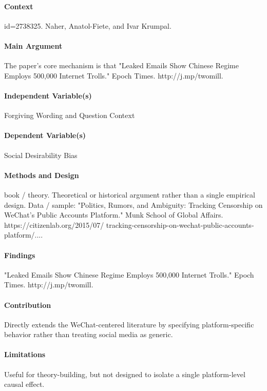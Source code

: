 \documentclass[12pt]{article}
\begin{document}
\paragraph{Context} id=2738325. Naher, Anatol-Fiete, and Ivar Krumpal.

\paragraph{Main Argument} The paper's core mechanism is that "Leaked Emails Show Chinese Regime Employs 500,000 Internet Trolls." Epoch Times. http://j.mp/twomill.

\paragraph{Independent Variable(s)} Forgiving Wording and Question Context

\paragraph{Dependent Variable(s)} Social Desirability Bias

\paragraph{Methods and Design} book / theory. Theoretical or historical argument rather than a single empirical design. Data / sample: "Politics, Rumors, and Ambiguity: Tracking Censorship on WeChat's Public Accounts Platform." Munk School of Global Affairs. https://citizenlab.org/2015/07/ tracking-censorship-on-wechat-public-accounts-platform/....

\paragraph{Findings} "Leaked Emails Show Chinese Regime Employs 500,000 Internet Trolls." Epoch Times. http://j.mp/twomill.

\paragraph{Contribution} Directly extends the WeChat-centered literature by specifying platform-specific behavior rather than treating social media as generic.

\paragraph{Limitations} Useful for theory-building, but not designed to isolate a single platform-level causal effect.
\end{document}
